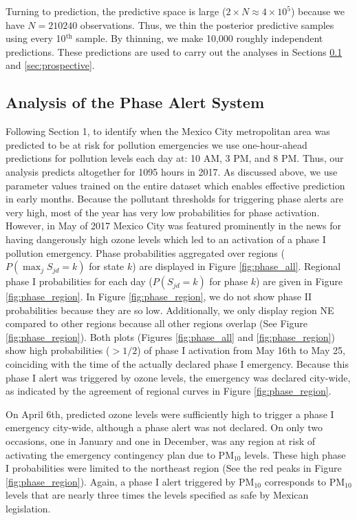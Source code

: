 \documentclass[alpha-refs]{wiley-article}
\begin{document}
Turning to prediction, the predictive space is large ($2 \times N \approx 4 \times 10^5$) because we have $N = 210240$ observations. Thus, we thin the posterior predictive samples using every 10$^\text{th}$ sample. By thinning, we make 10,000 roughly independent predictions. These predictions are used to carry out the analyses in Sections \ref{sec:retro_phase} and \ref{sec:prospective}.

\subsection{Analysis of the Phase Alert System}\label{sec:retro_phase}

Following Section 1, to identify when the Mexico City metropolitan area was predicted to be at risk for pollution emergencies we use one-hour-ahead predictions for pollution levels each day at: 10 AM, 3 PM, and 8 PM. Thus, our analysis predicts altogether for 1095 hours in 2017. 
As discussed above, we use parameter values trained on the entire dataset which enables effective prediction in early months. Because the pollutant thresholds for triggering phase alerts are very high, most of the year has very low probabilities for phase activation. However, in May of 2017 Mexico City was featured prominently in the news for having dangerously high ozone levels which led to an activation of a phase I pollution emergency. Phase probabilities aggregated over regions ($P(\max_j S_{jd} =k)$ for state $k$) are displayed in Figure \ref{fig:phase_all}. Regional phase I probabilities for each day ($P(S_{jd} = k)$ for phase $k$) are given in Figure \ref{fig:phase_region}. In Figure \ref{fig:phase_region}, we do not show phase II probabilities because they are so low. Additionally, we only display region NE compared to other regions because all other regions overlap (See Figure \ref{fig:phase_region}). Both plots (Figures \ref{fig:phase_all} and \ref{fig:phase_region}) show high probabilities ($>1/2$) of phase I activation from May 16th to May 25, coinciding with the time of the actually declared phase I emergency. Because this phase I alert was triggered by ozone levels, the emergency was declared city-wide, as indicated by the agreement of regional curves in Figure \ref{fig:phase_region}.

On April 6th, predicted ozone levels were sufficiently high to trigger a phase I emergency city-wide, although a phase alert was not declared. On only two occasions, one in January and one in December, was any region at risk of activating the emergency contingency plan due to $\text{PM}_{10}$ levels. These high phase I probabilities were limited to the northeast region (See the red peaks in Figure \ref{fig:phase_region}). Again, a phase I alert triggered by $\text{PM}_{10}$ corresponds to $\text{PM}_{10}$ levels that are nearly three times the levels specified as safe by Mexican legislation.
\end{document}
